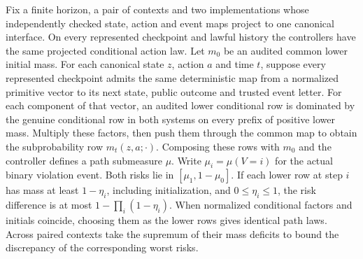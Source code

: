 \begin{theorem}\label{thm:t18}

Fix a finite horizon, a pair of contexts and two implementations whose independently checked state, action and event maps project to one canonical interface. On every represented checkpoint and lawful history the controllers have the same projected conditional action law. Let \(m_0\) be an audited common lower initial mass. For each canonical state \(z\), action \(a\) and time \(t\), suppose every represented checkpoint admits the same deterministic map from a normalized primitive vector to its next state, public outcome and trusted event letter. For each component of that vector, an audited lower conditional row is dominated by the genuine conditional row in both systems on every prefix of positive lower mass. Multiply these factors, then push them through the common map to obtain the subprobability row \(m_t(z,a;\cdot)\). Composing these rows with \(m_0\) and the controller defines a path submeasure \(\mu\). Write \(\mu_i=\mu(V=i)\) for the actual binary violation event. Both risks lie in \([\mu_1,1-\mu_0]\). If each lower row at step \(i\) has mass at least \(1-\eta_i\), including initialization, and \(0\le\eta_i\le1\), the risk difference is at most \(1-\prod_i(1-\eta_i)\). When normalized conditional factors and initials coincide, choosing them as the lower rows gives identical path laws. Across paired contexts take the supremum of their mass deficits to bound the discrepancy of the corresponding worst risks.

\end{theorem}

